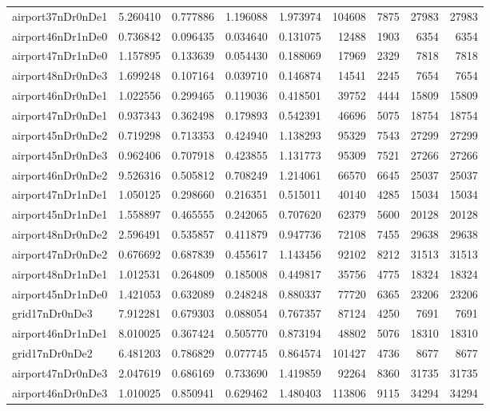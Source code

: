 \begin{longtable}{|l|r|r|r|r|r|r|r|r|}
airport37nDr0nDe1 & 5.260410 & 0.777886 & 1.196088 & 1.973974 & 104608 & 7875 & 27983 & 27983 \\
airport46nDr1nDe0 & 0.736842 & 0.096435 & 0.034640 & 0.131075 & 12488 & 1903 & 6354 & 6354 \\
airport47nDr1nDe0 & 1.157895 & 0.133639 & 0.054430 & 0.188069 & 17969 & 2329 & 7818 & 7818 \\
airport48nDr0nDe3 & 1.699248 & 0.107164 & 0.039710 & 0.146874 & 14541 & 2245 & 7654 & 7654 \\
airport46nDr0nDe1 & 1.022556 & 0.299465 & 0.119036 & 0.418501 & 39752 & 4444 & 15809 & 15809 \\
airport47nDr0nDe1 & 0.937343 & 0.362498 & 0.179893 & 0.542391 & 46696 & 5075 & 18754 & 18754 \\
airport45nDr0nDe2 & 0.719298 & 0.713353 & 0.424940 & 1.138293 & 95329 & 7543 & 27299 & 27299 \\
airport45nDr0nDe3 & 0.962406 & 0.707918 & 0.423855 & 1.131773 & 95309 & 7521 & 27266 & 27266 \\
airport46nDr0nDe2 & 9.526316 & 0.505812 & 0.708249 & 1.214061 & 66570 & 6645 & 25037 & 25037 \\
airport47nDr1nDe1 & 1.050125 & 0.298660 & 0.216351 & 0.515011 & 40140 & 4285 & 15034 & 15034 \\
airport45nDr1nDe1 & 1.558897 & 0.465555 & 0.242065 & 0.707620 & 62379 & 5600 & 20128 & 20128 \\
airport48nDr0nDe2 & 2.596491 & 0.535857 & 0.411879 & 0.947736 & 72108 & 7455 & 29638 & 29638 \\
airport47nDr0nDe2 & 0.676692 & 0.687839 & 0.455617 & 1.143456 & 92102 & 8212 & 31513 & 31513 \\
airport48nDr1nDe1 & 1.012531 & 0.264809 & 0.185008 & 0.449817 & 35756 & 4775 & 18324 & 18324 \\
airport45nDr1nDe0 & 1.421053 & 0.632089 & 0.248248 & 0.880337 & 77720 & 6365 & 23206 & 23206 \\
grid17nDr0nDe3 & 7.912281 & 0.679303 & 0.088054 & 0.767357 & 87124 & 4250 & 7691 & 7691 \\
airport46nDr1nDe1 & 8.010025 & 0.367424 & 0.505770 & 0.873194 & 48802 & 5076 & 18310 & 18310 \\
grid17nDr0nDe2 & 6.481203 & 0.786829 & 0.077745 & 0.864574 & 101427 & 4736 & 8677 & 8677 \\
airport47nDr0nDe3 & 2.047619 & 0.686169 & 0.733690 & 1.419859 & 92264 & 8360 & 31735 & 31735 \\
airport46nDr0nDe3 & 1.010025 & 0.850941 & 0.629462 & 1.480403 & 113806 & 9115 & 34294 & 34294 \\

\end{longtable}

